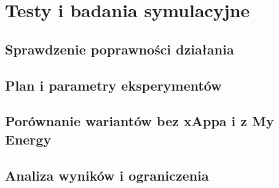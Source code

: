 \chapter{Testy i badania symulacyjne}
\label{chap:4}

\section{Sprawdzenie poprawności działania}
\label{sec:4:1}

\section{Plan i parametry eksperymentów}
\label{sec:4:2}

\section{Porównanie wariantów bez xAppa i z My Energy}
\label{sec:4:3}

\section{Analiza wyników i ograniczenia}
\label{sec:4:4}
